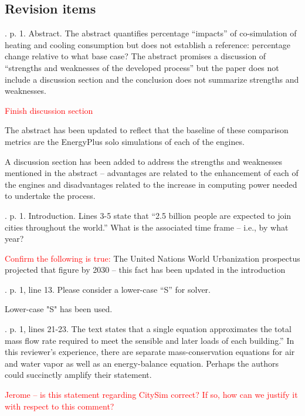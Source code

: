 \documentclass[answers,12pt]{exam}
\begin{document}
\subsection{Revision items}
\begin{questions}

. p. 1.  Abstract.  The abstract quantifies percentage “impacts” of co-simulation of heating and cooling consumption but does not establish a reference: percentage change relative to what base case?  The abstract promises a discussion of “strengths and weaknesses of the developed process” but the paper does not include a discussion section and the conclusion does not summarize strengths and weaknesses. 
\begin{solution}
\textcolor{red}{Finish discussion section}

The abstract has been updated to reflect that the baseline of these comparison metrics are the EnergyPlus solo simulations of each of the engines.

A discussion section has been added to address the strengths and weaknesses mentioned in the abstract -- advantages are related to the enhancement of each of the 
engines and disadvantages related to the increase in computing power needed to undertake the process.

\end{solution}

. p. 1. Introduction. Lines 3-5 state that “2.5 billion people are expected to join cities throughout the world.” What is the associated time frame – i.e., by what year? 
\begin{solution}
\textcolor{red}{Confirm the following is true:} The United Nations World Urbanization prospectus projected that figure by 2030 -- this fact has been updated in the introduction
\end{solution}

. p. 1, line 13. Please consider a lower-case “S” for solver.   
\begin{solution}
Lower-case "S" has been used.
\end{solution}

. p. 1, lines 21-23.  The text states that a single equation approximates the total mass flow rate required to meet the sensible and later loads of each building.”  In this reviewer’s experience, there are separate mass-conservation equations for air and water vapor as well as an energy-balance equation.  Perhaps the authors could succinctly amplify their statement. 
\begin{solution}
\textcolor{red}{Jerome -- is this statement regarding CitySim correct? If so, how can we justify it with respect to this comment?} 
\end{solution}


\end{questions}
\end{document}
